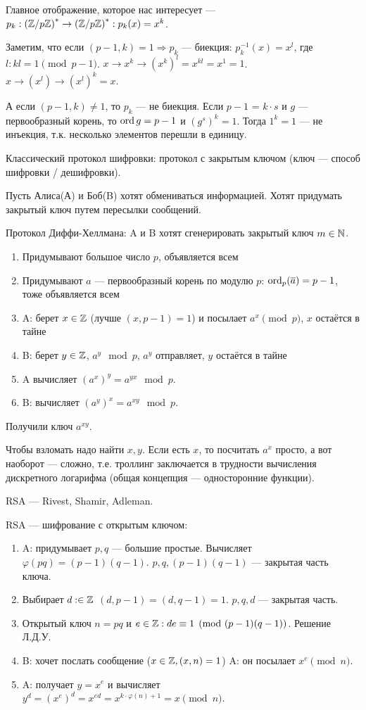 Главное отображение, которое нас интересует --- $p_k: \left(\mathbb{Z} / p\mathbb{Z}\right)^* \to \left(\mathbb{Z} / p\mathbb{Z}\right)^*: p_k(x) = x^k$.

Заметим, что если  $(p - 1,k)=1 \Rightarrow p_k$ --- биекция:  $p_k^{-1}(x) = x^l$, где  $l: kl = 1 \pmod{p-1}$.  $x\to x^k\to(x^k)^l = x^{kl} = x^1 = 1$. $x\to (x^l) \to (x^l)^k = x$.

А если $(p - 1, k) \neq 1$, то $p_k$ --- не биекция. Если  $p - 1$ =  $k \cdot s$ и  $g$ --- первообразный корень, то  $\operatorname{ord} g = p - 1$ и $(g^s)^k = 1$. Тогда  $1^k=1$ --- не инъекция, т.к. несколько элементов перешли в единицу.

Классический протокол шифровки: протокол с закрытым ключом (ключ --- способ шифровки / дешифровки).

Пусть Алиса(А) и Боб(B) хотят обмениваться информацией. Хотят придумать закрытый ключ путем пересылки сообщений. 

Протокол Диффи-Хеллмана: A и B хотят сгенерировать закрытый ключ $m \in \mathbb{N}$.
 \begin{enumerate}
     \item Придумывают большое число $p$, объявляется всем
     \item Придумывают  $a$ --- первообразный корень по модулю  $p$:  $\operatorname{ord}_p(\overline{a}) = p - 1$, тоже объявляется всем
     \item A: берет  $x \in \mathbb{Z}$ (лучше $(x, p - 1) = 1$) и посылает $a^x \pmod p$, $x$ остаётся в тайне
     \item B: берет $y \in \mathbb{Z}$,  $a^y \mod p$, $a^y$ отправляет, $y$ остаётся в тайне
     \item A вычисляет $\left(a^x\right)^y = a^{yx} \mod p$.
     \item B: вычисляет $(a^y)^x = a^{xy} \mod p$.
\end{enumerate}

Получили ключ  $a^{xy}$.

Чтобы взломать надо найти $x, y$. Если есть  $x$, то посчитать  $a^x$ просто, а вот наоборот --- сложно, т.е. троллинг заключается в трудности вычисления дискретного логарифма (общая концепция --- односторонние функции).

RSA --- Rivest, Shamir, Adleman.

RSA --- шифрование с открытым ключом:
\begin{enumerate}
    \item A: придумывает $p, q$ --- большие простые. Вычисляет  $\varphi(pq) = (p-1)(q-1)$.  $p, q, (p-1)(q-1)$ --- закрытая часть ключа. 
    \item Выбирает  $d: \in \mathbb{Z}$  $(d, p - 1) = (d, q - 1) = 1$.  $p, q, d$ --- закрытая часть.
    \item Открытый ключ $n = pq$ и  $e \in \mathbb{Z}: de \equiv 1 \pmod{(p-1)(q-1)}$. Решение Л.Д.У.
    \item B: хочет послать сообщение ($x \in \mathbb{Z}, (x, n) = 1$) A: он посылает $x^e \pmod n$.
    \item  A: получает  $y=x^e$ и вычисляет  $y^d = (x^e)^d = x^{ed} = x^{k \cdot \varphi(n) + 1} = x \pmod{n}$.
\end{enumerate}


